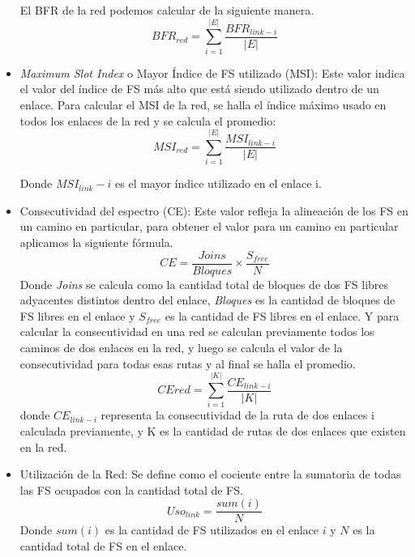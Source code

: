 \begin{itemize}
    El BFR de la red podemos calcular de la siguiente manera.
    \begin{equation}
       BFR_{red} = \sum_{i=1}^{\left | E \right |} \frac{BFR_{link - i}}{{\left | E \right |}}
    \end{equation}
    \item \textit{Maximum Slot Index} o Mayor Índice de FS utilizado (MSI): Este valor indica el valor del índice de FS más alto que está siendo utilizado dentro de un enlace.
    Para calcular el MSI de la red, se halla el índice máximo usado en todos los enlaces de la red y se calcula el promedio:
    \begin{equation}
        MSI_{red} = \sum_{i=1}^{\left | E \right |} \frac{MSI_{link - i}}{{\left | E \right |}}
    \end{equation}

    Donde  \(MSI_{link} - i\) es el mayor índice utilizado en el enlace i.
    \item Consecutividad del espectro (CE)\cite{wang2012spectrum}: Este valor refleja la alineación de los FS en un camino en particular, para obtener el valor para un camino en particular aplicamos la siguiente fórmula.
    \begin{equation}
        CE = \frac{Joins}{Bloques} \times \frac{S_{free}}{  N  }
    \end{equation}
    Donde \textit{Joins} se calcula como la cantidad total de bloques de dos FS libres adyacentes distintos dentro del enlace, \textit{Bloques} es la cantidad de bloques de FS libres en el enlace y \(S_{free}\) es la cantidad de FS libres en el enlace.
    Y para calcular la consecutividad en una red se calculan previamente todos los caminos de dos enlaces en la red, y luego se calcula el valor de la consecutividad para todas esas rutas y al final se halla el promedio.
    \begin{equation}
        CE{red} = \sum_{i=1}^{\left | K \right |} \frac{CE_{link - i}}{{\left | K \right |}}
    \end{equation}
    donde \(CE_{link - i}\) representa la consecutividad de la ruta de dos enlaces i calculada previamente, y K es la cantidad de rutas de dos enlaces que existen en la red. 
    \item Utilización de la Red: Se define como el cociente entre la sumatoria de todas las FS ocupados con la cantidad total de FS.
    \begin{equation}
        Uso_{link} =  \frac{sum(i)}{N}
    \end{equation}
    Donde \(sum(i)\) es la cantidad de FS utilizados en el enlace \(i\) y \(N\) es la cantidad total de FS en el enlace. 
    

\end{itemize}
